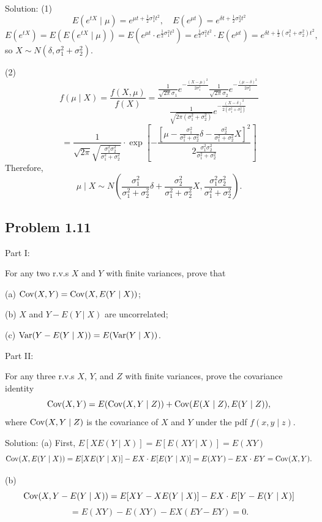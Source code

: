 {Solution:}
(1)
\[
E\left(e^{tX}\mid\mu\right)=e^{\mu t+\frac{1}{2}\sigma_{1}^{2}t^{2}},\quad E\left(e^{\mu t}\right)=e^{\delta t+\frac{1}{2}\sigma_{2}^{2}t^{2}}
\]
\[
E\left(e^{tX}\right)=E\left(E\left(e^{tX}\mid\mu\right)\right)=E\left(e^{\mu t}\cdot e^{\frac{1}{2}\sigma_{1}^{2}t^{2}}\right)=e^{\frac{1}{2}\sigma_{1}^{2}t^{2}}\cdot E\left(e^{\mu t}\right)=e^{\delta t+\frac{1}{2}\left(\sigma_{1}^{2}+\sigma_{2}^{2}\right)t^{2}},
\]
so $X\sim N\left(\delta,\sigma_{1}^{2}+\sigma_{2}^{2}\right)$.

(2)
\[
f(\mu\mid X)=\frac{f(X,\mu)}{f(X)}=\frac{\frac{1}{\sqrt{2\pi}\sigma_{1}}e^{-\frac{(X-\mu)^{2}}{2\sigma_{1}^{2}}}\frac{1}{\sqrt{2\pi}\sigma_{2}}e^{-\frac{(\mu-\delta)^{2}}{2\sigma_{2}^{2}}}}{\frac{1}{\sqrt{2\pi\left(\sigma_{1}^{2}+\sigma_{2}^{2}\right)}}e^{-\frac{(X-\delta)^{2}}{2\left(\sigma_{1}^{2}+\sigma_{2}^{2}\right)}}}
\]
\[
=\frac{1}{\sqrt{2\pi}\sqrt{\frac{\sigma_{1}^{2}\sigma_{2}^{2}}{\sigma_{1}^{2}+\sigma_{2}^{2}}}}\cdot\exp\left[-\frac{\left[\mu-\frac{\sigma_{1}^{2}}{\sigma_{1}^{2}+\sigma_{2}^{2}}\delta-\frac{\sigma_{2}^{2}}{\sigma_{1}^{2}+\sigma_{2}^{2}}X\right]^{2}}{2\frac{\sigma_{1}^{2}\sigma_{2}^{2}}{\sigma_{1}^{2}+\sigma_{2}^{2}}}\right]
\]
Therefore,
\[
\mu\mid X\sim N\left(\frac{\sigma_{1}^{2}}{\sigma_{1}^{2}+\sigma_{2}^{2}}\delta+\frac{\sigma_{2}^{2}}{\sigma_{1}^{2}+\sigma_{2}^{2}}X,\frac{\sigma_{1}^{2}\sigma_{2}^{2}}{\sigma_{1}^{2}+\sigma_{2}^{2}}\right).
\]

\subsection*{Problem 1.11}
Part I:

For any two r.v.s $X$ and $Y$ with finite variances, prove that

(a) $\operatorname{Cov}(X,Y)=\operatorname{Cov}(X,E(Y\mid X))$;

(b) $X$ and $Y-E(Y\mid X)$ are uncorrelated;

(c) $\operatorname{Var}(Y-E(Y\mid X))=E(\operatorname{Var}(Y\mid X))$.

Part II:

For any three r.v.s $X$, $Y$, and $Z$ with finite variances, prove the covariance identity
\[
\operatorname{Cov}(X,Y)=E(\operatorname{Cov}(X,Y\mid Z))+\operatorname{Cov}(E(X\mid Z),E(Y\mid Z)),
\]
where $\operatorname{Cov}(X,Y\mid Z)$ is the covariance of $X$ and $Y$ under the pdf $f(x,y\mid z)$.

{Solution:}
(a) First, $E[XE(Y\mid X)]=E[E(XY\mid X)]=E(XY)$
\[
\operatorname{Cov}(X,E(Y\mid X))=E[XE(Y\mid X)]-EX\cdot E[E(Y\mid X)]=E(XY)-EX\cdot EY=\operatorname{Cov}(X,Y).
\]

(b)
\[
\operatorname{Cov}(X,Y-E(Y\mid X))=E[XY-XE(Y\mid X)]-EX\cdot E[Y-E(Y\mid X)]
\]
\[
=E(XY)-E(XY)-EX(EY-EY)=0.
\]

